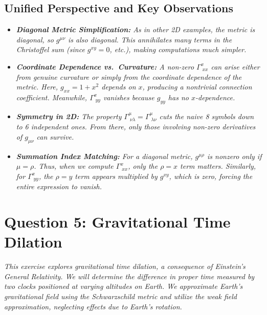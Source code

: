     \bigskip

    \subsection*{Unified Perspective and Key Observations}

    \begin{itemize}
        \item \emph{\textbf{Diagonal Metric Simplification:} As in other 2D examples, the metric is diagonal, so \(g^{\mu\nu}\) is also diagonal. This annihilates many terms in the Christoffel sum (since \(g^{xy} = 0\), etc.), making computations much simpler.}

        \item \emph{\textbf{Coordinate Dependence vs.\ Curvature:} A non-zero \(\Gamma^x_{\;xx}\) can arise either from genuine curvature or simply from the coordinate dependence of the metric. Here, \(g_{xx} = 1 + x^2\) depends on \(x\), producing a nontrivial connection coefficient. Meanwhile, \(\Gamma^x_{\;yy}\) vanishes because \(g_{yy}\) has no \(x\)-dependence.}

        \item \emph{\textbf{Symmetry in 2D:} The property \(\Gamma^\mu_{\;\nu\lambda} = \Gamma^\mu_{\;\lambda\nu}\) cuts the naive 8 symbols down to 6 independent ones. From there, only those involving non-zero derivatives of \(g_{\mu\nu}\) can survive.}

        \item \emph{\textbf{Summation Index Matching:} For a diagonal metric, \(g^{\mu\rho}\) is nonzero only if \(\mu = \rho\). Thus, when we compute \(\Gamma^x_{\;xx}\), only the \(\rho = x\) term matters. Similarly, for \(\Gamma^x_{\;yy}\), the \(\rho = y\) term appears multiplied by \(g^{xy}\), which is zero, forcing the entire expression to vanish.}
    \end{itemize}

    \pagebreak


    \section*{Question 5: Gravitational Time Dilation}

    \textit{This exercise explores gravitational time dilation, a consequence of Einstein's General Relativity. We will determine the difference in proper time measured by two clocks positioned at varying altitudes on Earth. We approximate Earth's gravitational field using the Schwarzschild metric and utilize the weak field approximation, neglecting effects due to Earth's rotation.}

